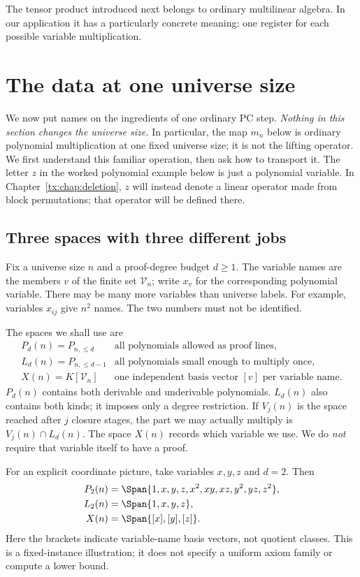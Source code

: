 \documentclass[11pt,a4paper,oneside,openany]{book}
\theoremstyle{definition}\newtheorem{definition}[theorem]{Definition}
\theoremstyle{remark}\newtheorem{remark}[theorem]{Remark}
\numberwithin{equation}{chapter}
\begin{document}
The tensor product introduced next belongs to ordinary multilinear
algebra. In our application it has a particularly concrete meaning:
one register for each possible variable multiplication.

\section{The data at one universe size}
\label{tx:sec:multiplication-registers}
We now put names on the ingredients of one ordinary PC step.
\emph{Nothing in this section changes the universe size.}
In particular, the map $m_n$ below is ordinary polynomial
multiplication at one fixed universe size; it is not the lifting operator.
We first understand this familiar operation, then ask how to transport it.
The letter $z$ in the worked polynomial example below is just a
polynomial variable. In Chapter~\ref{tx:chap:deletion}, $z$ will instead
denote a linear operator made from block permutations; that operator
will be defined there.

\subsection{Three spaces with three different jobs}
Fix a universe size $n$ and a proof-degree budget $d\ge1$.
The variable names are the members $v$ of the finite set
$\mathcal V_n$; write $x_v$ for the corresponding polynomial variable.
There may be many more variables than universe labels.
For example, variables $x_{ij}$ give $n^2$ names.
The two numbers must not be identified.

The spaces we shall use are
\[
 \begin{array}{ll}
 P_d(n)=P_{n,\le d}
   &\text{all polynomials allowed as proof lines},\\
 L_d(n)=P_{n,\le d-1}
   &\text{all polynomials small enough to multiply once},\\
 X(n)=K[\mathcal V_n]
   &\text{one independent basis vector $[v]$ per variable name}.
 \end{array}
\]
$P_d(n)$ contains both derivable and underivable polynomials.
$L_d(n)$ also contains both kinds; it imposes only a degree restriction.
If $V_j(n)$ is the space reached after $j$ closure stages, the part
we may actually multiply is $V_j(n)\cap L_d(n)$.
The space $X(n)$ records which variable we use. We do \emph{not}
require that variable itself to have a proof.

For an explicit coordinate picture, take variables $x,y,z$ and $d=2$.
Then
\[
 \begin{split}
 P_2(n)&=\Span\{1,x,y,z,x^2,xy,xz,y^2,yz,z^2\},\\
 L_2(n)&=\Span\{1,x,y,z\},\\
 X(n)&=\Span\{[x],[y],[z]\}.
 \end{split}
\]
Here the brackets indicate variable-name basis vectors, not quotient
classes. This is a fixed-instance illustration; it does not specify
a uniform axiom family or compute a lower bound.
\end{document}
